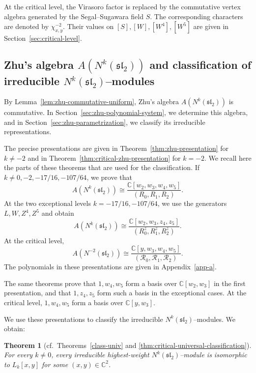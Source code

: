 \documentclass[11 pt]{amsart}
\newtheorem{theorem}{Theorem}
\theoremstyle{definition}
\theoremstyle{plain}
\begin{document}
At the critical level, the Virasoro factor is replaced by the
commutative vertex algebra generated by the Segal--Sugawara field $S$.
The corresponding characters are denoted by
$\chi^{-2}_{x,y}$. Their values on
$[S],[W],[W^4],[W^5]$ are given in
Section~\ref{sec:critical-level}.



\subsection*{Zhu's algebra $A(N^k(\mathfrak{sl}_2))$ and classification
of irreducible $N^k(\mathfrak{sl}_2)$--modules}

By Lemma~\ref{lem:zhu-commutative-uniform}, Zhu's algebra
$A(N^k(\mathfrak{sl}_2))$ is commutative.
In Section~\ref{sec:zhu-polynomial-system}, we determine this algebra,
and in Section~\ref{sec:zhu-parametrization}, we classify its
irreducible representations.

  The precise
presentations are given in Theorem~\ref{thm:zhu-presentation} for
$k\neq-2$ and in Theorem~\ref{thm:critical-zhu-presentation} for
$k=-2$.  We recall here the parts of these theorems that are used for
the classification.  If
$k\neq0,-2,-17/16,-107/64$, we prove that
\[
A(N^k(\mathfrak{sl}_2))
\cong
\frac{\mathbb C[w_2,w_3,w_4,w_5]}{(R_0,R_1,R_2)}.
\]
At the two exceptional levels $k=-17/16,-107/64$, we use the
generators $L,W,Z^4,Z^5$ and obtain
\[
A(N^k(\mathfrak{sl}_2))
\cong
\frac{\mathbb C[w_2,w_3,z_4,z_5]}
{(R_0^z,R_1^z,R_2^z)}.
\]
At the critical level,
\[
A(N^{-2}(\mathfrak{sl}_2))
\cong
\frac{\mathbb C[y,w_3,w_4,w_5]}
{(\mathcal R_0,\mathcal R_1,\mathcal R_2)}.
\]
The polynomials in these presentations are given in
Appendix~\ref{app-a}.

The same theorems prove that
$1,w_4,w_5$ form a basis over $\mathbb C[w_2,w_3]$ in the first
presentation, and that $1,z_4,z_5$ form such a
basis in the exceptional cases.  At the critical level,   $1,w_4,w_5$ form a basis over
$\mathbb C[y,w_3]$.

We use these presentations to classify the irreducible
$N^k(\mathfrak{sl}_2)$--modules.    We obtain:

\begin{theorem}[cf.\ Theorems~\ref{class-univ} and
\ref{thm:critical-universal-classification}]
For every $k\neq0$, every irreducible highest-weight
$N^k(\mathfrak{sl}_2)$--module is isomorphic to $L_k[x,y]$ for some
$(x,y)\in\mathbb C^2$.
\end{theorem}
\end{document}
